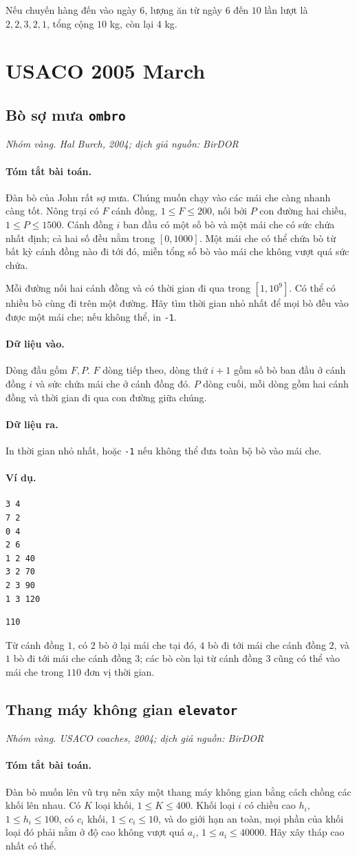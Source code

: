 \documentclass[11pt]{article}
\newcommand{\problem}[4]{%
  \subsection[#1 (#2)]{#1 \hfill {\normalsize\texttt{#2}}}%
  \noindent\textit{#3. #4}\par\smallskip
}
\newcommand{\iosec}[1]{\paragraph{#1}}
\begin{document}
Nếu chuyến hàng đến vào ngày \(6\), lượng ăn từ ngày \(6\) đến \(10\) lần lượt
là \(2,2,3,2,1\), tổng cộng \(10\) kg, còn lại \(4\) kg.

\section{USACO 2005 March}

\problem{Bò sợ mưa}{ombro}{Nhóm vàng}{Hal Burch, 2004; dịch giả nguồn: BirDOR}

\iosec{Tóm tắt bài toán.}
Đàn bò của John rất sợ mưa. Chúng muốn chạy vào các mái che càng nhanh càng
tốt. Nông trại có \(F\) cánh đồng, \(1\le F\le 200\), nối bởi \(P\) con đường
hai chiều, \(1\le P\le 1500\). Cánh đồng \(i\) ban đầu có một số bò và một mái
che có sức chứa nhất định; cả hai số đều nằm trong \([0,1000]\). Một mái che
có thể chứa bò từ bất kỳ cánh đồng nào đi tới đó, miễn tổng số bò vào mái che
không vượt quá sức chứa.

Mỗi đường nối hai cánh đồng và có thời gian đi qua trong \([1,10^9]\). Có thể
có nhiều bò cùng đi trên một đường. Hãy tìm thời gian nhỏ nhất để mọi bò đều
vào được một mái che; nếu không thể, in \texttt{-1}.

\iosec{Dữ liệu vào.}
Dòng đầu gồm \(F,P\). \(F\) dòng tiếp theo, dòng thứ \(i+1\) gồm số bò ban đầu
ở cánh đồng \(i\) và sức chứa mái che ở cánh đồng đó. \(P\) dòng cuối, mỗi dòng
gồm hai cánh đồng và thời gian đi qua con đường giữa chúng.

\iosec{Dữ liệu ra.}
In thời gian nhỏ nhất, hoặc \texttt{-1} nếu không thể đưa toàn bộ bò vào mái
che.

\iosec{Ví dụ.}
\begin{verbatim}
3 4
7 2
0 4
2 6
1 2 40
3 2 70
2 3 90
1 3 120
\end{verbatim}

\begin{verbatim}
110
\end{verbatim}

Từ cánh đồng \(1\), có \(2\) bò ở lại mái che tại đó, \(4\) bò đi tới mái che
cánh đồng \(2\), và \(1\) bò đi tới mái che cánh đồng \(3\); các bò còn lại
từ cánh đồng \(3\) cũng có thể vào mái che trong \(110\) đơn vị thời gian.

\problem{Thang máy không gian}{elevator}{Nhóm vàng}{USACO coaches, 2004; dịch giả nguồn: BirDOR}

\iosec{Tóm tắt bài toán.}
Đàn bò muốn lên vũ trụ nên xây một thang máy không gian bằng cách chồng các
khối lên nhau. Có \(K\) loại khối, \(1\le K\le 400\). Khối loại \(i\) có chiều
cao \(h_i\), \(1\le h_i\le 100\), có \(c_i\) khối, \(1\le c_i\le 10\), và do
giới hạn an toàn, mọi phần của khối loại đó phải nằm ở độ cao không vượt quá
\(a_i\), \(1\le a_i\le 40000\). Hãy xây tháp cao nhất có thể.
\end{document}
